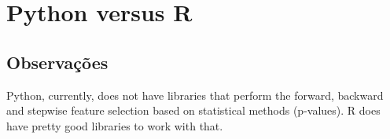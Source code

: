 
\chapter{Python versus R} %

\label{ChapterX} %


\section{Observações}

Python, currently, does not have libraries that perform the forward, backward and stepwise feature selection based on statistical methods (p-values). R does have pretty good libraries to work with that.
